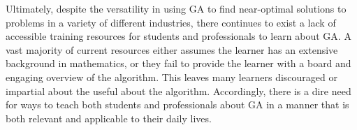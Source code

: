 \documentclass{article}
\begin{document}
Ultimately, despite the versatility in using GA to find near-optimal solutions to problems in a variety of different industries, there continues to exist a lack of accessible training resources for students and professionals to learn about GA. A vast majority of current resources either assumes the learner has an extensive background in mathematics, or they fail to provide the learner with a board and engaging overview of the algorithm. This leaves many learners discouraged or impartial about the useful about the algorithm. Accordingly, there is a dire need for ways to teach both students and professionals about GA in a manner that is both relevant and applicable to their daily lives.
\end{document}
